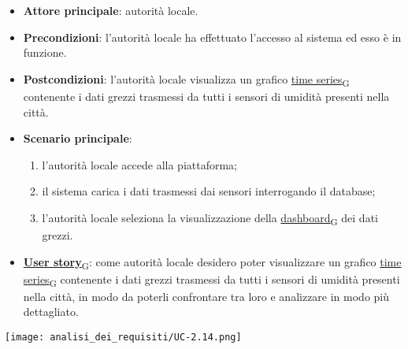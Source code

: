 \begin{itemize}
	\item \textbf{Attore principale}: autorità locale.
	\item \textbf{Precondizioni}: l'autorità locale ha effettuato l'accesso al sistema ed esso è in funzione.
	\item \textbf{Postcondizioni}: l'autorità locale visualizza un grafico \href{https://7last.github.io/docs/rtb/documentazione-interna/glossario\#time-series}{time series\textsubscript{G}} contenente i dati grezzi trasmessi da tutti i sensori
	      di umidità presenti nella città.
	\item \textbf{Scenario principale}:
	      \begin{enumerate}
		      \item l'autorità locale accede alla piattaforma;
		      \item il sistema carica i dati trasmessi dai sensori interrogando il database;
		      \item l'autorità locale seleziona la visualizzazione della \href{https://7last.github.io/docs/rtb/documentazione-interna/glossario\#dashboard}{dashboard\textsubscript{G}} dei dati grezzi.
	      \end{enumerate}
	\item \href{https://7last.github.io/docs/rtb/documentazione-interna/glossario\#user-story}{\textbf{User story}\textsubscript{G}}:
	      come autorità locale desidero poter visualizzare un grafico \href{https://7last.github.io/docs/rtb/documentazione-interna/glossario\#time-series}{time series\textsubscript{G}} contenente i dati grezzi trasmessi da tutti i sensori
	      di umidità presenti nella città, in modo da poterli confrontare tra loro e analizzare in modo più dettagliato.
\end{itemize}
\begin{center}
	\texttt{[image: analisi\_dei\_requisiti/UC-2.14.png]}
\end{center}

\newpage

